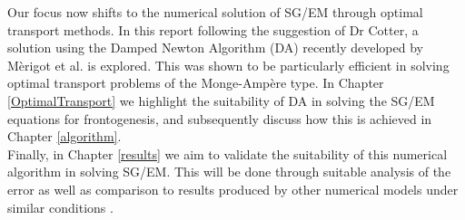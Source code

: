 Our focus now shifts to the numerical solution of SG/EM through optimal transport methods. In this report following the suggestion of Dr Cotter, a solution using the Damped Newton Algorithm (DA) recently developed by M\`{e}rigot et al. \cite{Merigot2017, Merigot2017a, Kitagawa2016} is explored. This was shown to be particularly efficient in solving optimal transport problems of the Monge-Amp\`{e}re type. In Chapter \ref{OptimalTransport} we highlight the suitability of DA in solving the SG/EM equations for frontogenesis, and subsequently discuss how this is achieved in Chapter \ref{algorithm}.
\\
\linebreak
Finally, in Chapter \ref{results} we aim to validate the suitability of this numerical algorithm in solving SG/EM. This will be done through suitable analysis of the error as well as comparison to results produced by other numerical models under similar conditions \cite{Nakamura1994,Cullen1993}.

